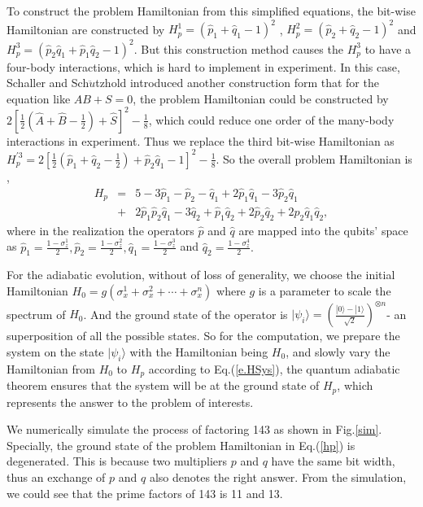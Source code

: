\documentclass[twocolumn,showpacs,twoside,10pt,prl]{revtex4}
\begin{document}
To construct the problem Hamiltonian from this simplified equations,
the bit-wise Hamiltonian are constructed by
$H^{1}_p=(\hat{p}_1+\hat{q}_1 -1)^2$ , $H^{2}_p=(\hat{p}_2+\hat{q}_2
-1)^2$ and $H^{3}_p=(\hat{p}_2\hat{q}_1+\hat{p}_1\hat{q}_2 - 1 )^2$. But this construction
method causes the $H^{3}_p$ to have a four-body interactions, which
is hard to implement in experiment. In this case, Schaller and
Sch$\ddot{u}$tzhold\cite{Schaller}  introduced another construction form that for
the equation like $AB+S=0$, the problem Hamiltonian could be
constructed by
$2[\frac{1}{2}(\hat{A}+\hat{B}-\frac{1}{2})+\hat{S}]^2-\frac{1}{8}$,
which could reduce one order of the many-body interactions in
experiment. Thus we replace the third bit-wise Hamiltonian as
$H_p^{'3}=2 [\frac{1}{2} (\hat{p}_1 + \hat{q}_2 - \frac{1}{2}) +
\hat{p}_2\hat{q}_1 - 1]^2 - \frac{1}{8}$. So the overall problem
Hamiltonian is ,
\begin{eqnarray}
H_p &=& 5-3 \hat{p}_1-\hat{p}_2-\hat{q}_1+2 \hat{p}_1 \hat{q}_1-3 \hat{p}_2 \hat{q}_1\nonumber\\
&+&2 \hat{p}_1 \hat{p}_2 \hat{q}_1-3 \hat{q}_2+\hat{p}_1
\hat{q}_2+2\hat{p}_2 \hat{q}_2+2 \hat{p}_2 \hat{q}_1
\hat{q}_2\nonumber,\label{hp}
\end{eqnarray}
where in the realization the operators $\hat{p}$ and $\hat{q}$ are
mapped into the qubits' space as $\hat{p}_1=\frac{1-\sigma_z^1}{2},
\hat{p}_2=\frac{1-\sigma_z^2}{2}, \hat{q}_1=\frac{1-\sigma_z^3}{2}$
and $ \hat{q}_2=\frac{1-\sigma_z^4}{2}. $

For the adiabatic evolution, without of loss of generality, we
choose the initial Hamiltonian $H_0=g(\sigma_{x}^{1}+\sigma_{x}^{2}+\cdots+\sigma_{x}^{n})$ where
$g$ is a parameter to scale the spectrum of $H_0$. And the ground
state of the operator is $|\psi_i\rangle=\left(
\frac{|0\rangle-|1\rangle}{\sqrt{2}} \right)^{\otimes n}$- an
superposition of all the possible states. So for the computation, we
prepare the system on the state $|\psi_i\rangle$ with the Hamiltonian being
$H_0$, and slowly vary the Hamiltonian from $H_0$ to $H_p$ according
to Eq.(\ref{e.HSys}), the quantum adiabatic theorem ensures that the
system will be at the ground state of $H_p$, which represents the
answer to the problem of interests.

We numerically simulate the process of factoring 143 as shown in
Fig.\ref{sim}. Specially, the ground state of the problem
Hamiltonian in Eq.(\ref{hp}) is degenerated. This is because two
multipliers $p$ and $q$ have the same bit width, thus an exchange of
$p$ and $q$ also denotes the right answer. From the simulation, we
could see that the prime factors of 143 is 11 and 13.
\end{document}

